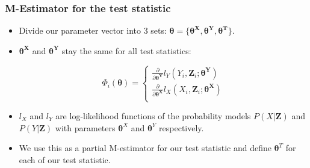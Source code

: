 \documentclass{beamer}
\begin{document}
\begin{frame}
	\frametitle{M-Estimator for the test statistic}
	\begin{itemize}
		\item Divide our parameter vector into $ 3 $ sets: $ \bm{\theta} = \{ \bm{\theta^\bm{X}}, \bm{\theta^\bm{Y}}, \bm{\theta^\bm{T}} \} $.
		\item $ \bm{\theta^\bm{X}} $ and $ \bm{\theta^\bm{Y}} $ stay the same for all test
			statistics:

			\begin{equation*}
			\Phi_i(\bm{\theta}) = \begin{cases}
				\frac{\partial}{\partial \bm{\theta}^{\bm{Y}}} l_Y (Y_i, \bm{Z}_i; \bm{\theta^{Y}}) \\
				\frac{\partial}{\partial \bm{\theta}^{\bm{X}}} l_X (X_i, \bm{Z}_i; \bm{\theta^{X}}) \\
				\end{cases}
			\end{equation*}

		\item $ l_X $ and $ l_Y $ are log-likelihood functions of the probability models $ P(X | \bm{Z}) $ and $ P(Y | \bm{Z}) $ with parameters $ \bm{\theta}^X $ and $ \bm{\theta}^Y $ respectively.
		\item We use this as a partial M-estimator for our test statistic and define $ \bm{\theta}^T $ for each of our test statistic.
	\end{itemize}
\end{frame}
\end{document}
